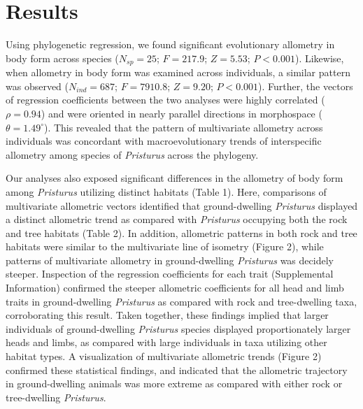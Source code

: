 \documentclass[
  11pt,
]{article}
\begin{document}
\hypertarget{results}{%
\section{Results}\label{results}}

Using phylogenetic regression, we found significant evolutionary
allometry in body form across species (\(N_{sp}=25\); \(F = 217.9\);
\(Z =5.53\); \(P < 0.001\)). Likewise, when allometry in body form was
examined across individuals, a similar pattern was observed
(\(N_{ind}=687\); \(F = 7910.8\); \(Z =9.20\); \(P < 0.001\)). Further,
the vectors of regression coefficients between the two analyses were
highly correlated (\(\rho = 0.94\)) and were oriented in nearly parallel
directions in morphospace (\(\theta = 1.49^\circ\)). This revealed that
the pattern of multivariate allometry across individuals was concordant
with macroevolutionary trends of interspecific allometry among species
of \emph{Pristurus} across the phylogeny. \hfill\break

Our analyses also exposed significant differences in the allometry of
body form among \emph{Pristurus} utilizing distinct habitats (Table 1).
Here, comparisons of multivariate allometric vectors identified that
ground-dwelling \emph{Pristurus} displayed a distinct allometric trend
as compared with \emph{Pristurus} occupying both the rock and tree
habitats (Table 2). In addition, allometric patterns in both rock and
tree habitats were similar to the multivariate line of isometry (Figure
2), while patterns of multivariate allometry in ground-dwelling
\emph{Pristurus} was decidely steeper. Inspection of the regression
coefficients for each trait (Supplemental Information) confirmed the
steeper allometric coefficients for all head and limb traits in
ground-dwelling \emph{Pristurus} as compared with rock and tree-dwelling
taxa, corroborating this result. Taken together, these findings implied
that larger individuals of ground-dwelling \emph{Pristurus} species
displayed proportionately larger heads and limbs, as compared with large
individuals in taxa utilizing other habitat types. A visualization of
multivariate allometric trends (Figure 2) confirmed these statistical
findings, and indicated that the allometric trajectory in
ground-dwelling animals was more extreme as compared with either rock or
tree-dwelling \emph{Pristurus}. \hfill\break
\end{document}
